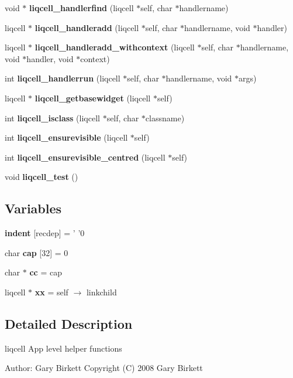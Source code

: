 \begin{CompactItemize}
\item 
void $\ast$ {\bf liqcell\_\-handlerfind} (liqcell $\ast$self, char $\ast$handlername)
\item 
liqcell $\ast$ {\bf liqcell\_\-handleradd} (liqcell $\ast$self, char $\ast$handlername, void $\ast$handler)
\item 
liqcell $\ast$ {\bf liqcell\_\-handleradd\_\-withcontext} (liqcell $\ast$self, char $\ast$handlername, void $\ast$handler, void $\ast$context)
\item 
int {\bf liqcell\_\-handlerrun} (liqcell $\ast$self, char $\ast$handlername, void $\ast$args)
\item 
liqcell $\ast$ {\bf liqcell\_\-getbasewidget} (liqcell $\ast$self)
\item 
int {\bf liqcell\_\-isclass} (liqcell $\ast$self, char $\ast$classname)
\item 
int {\bf liqcell\_\-ensurevisible} (liqcell $\ast$self)
\item 
int {\bf liqcell\_\-ensurevisible\_\-centred} (liqcell $\ast$self)
\item 
void {\bf liqcell\_\-test} ()
\end{CompactItemize}
\subsection*{Variables}
\begin{CompactItemize}
\item 
\textbf{indent} [recdep] = ' '0\label{d5/da2/liqcell_8c_3606238283a1feece4fb04c2008dfc7e}

\item 
char \textbf{cap} [32] = 0\label{d5/da2/liqcell_8c_278fd3b487cba14978daf2147e7c0a3e}

\item 
char $\ast$ \textbf{cc} = cap\label{d5/da2/liqcell_8c_0926e3f1a88f7c4fb7f9b61aa73844ed}

\item 
liqcell $\ast$ \textbf{xx} = self $\rightarrow$ linkchild\label{d5/da2/liqcell_8c_acf548691ef46f259a030128efa54478}

\end{CompactItemize}


\label{_details}
\subsection{Detailed Description}
liqcell App level helper functions 

\begin{Desc}
\item[Author:]Gary Birkett Copyright (C) 2008 Gary Birkett\end{Desc}
